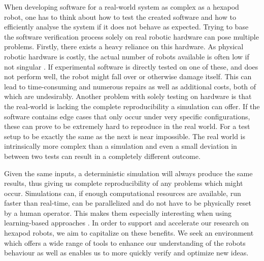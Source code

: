 When developing software for a real-world system as complex as a hexapod robot, one has to think about how to test the created software and how to efficiently analyse the system if it does not behave as expected.
Trying to base the software verification process solely on real robotic hardware can pose multiple problems.
Firstly, there exists a heavy reliance on this hardware.
As physical robotic hardware is costly, the actual number of robots available is often low if not singular \parencite{collins2021review, marvel2014collaborative}.
If experimental software is directly tested on one of these, and does not perform well, the robot might fall over or otherwise damage itself.
This can lead to time-consuming  and numerous repairs as well as additional costs, both of which are undesirably.
Another problem with solely testing on hardware is that the real-world is lacking the complete reproducibility a simulation can offer.
If the software contains edge cases that only occur under very specific configurations, these can prove to be extremely hard to reproduce in the real world.
For a test setup to be exactly the same as the next is near impossible.
The real world is intrinsically more complex than a simulation and even a small deviation in between two tests can result in a completely different outcome.

Given the same inputs, a deterministic simulation will always produce the same results, thus giving us complete reproducibility of any problems which might occur.
Simulations can, if enough computational resources are available, run faster than real-time, can be parallelized and do not have to be physically reset by a human operator.
This makes them especially interesting when using learning-based approaches \parencite{collins2021review}.
In order to support and accelerate our research on hexapod robots, we aim to capitalize on these benefits.
We seek an environment which offers a wide range of tools to enhance our understanding of the robots behaviour as well as enables us to more quickly verify and optimize new ideas.

